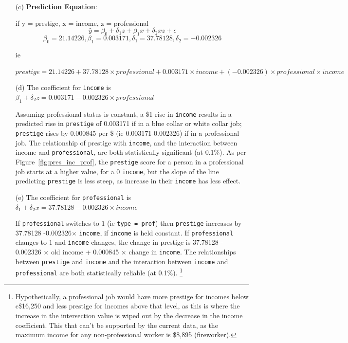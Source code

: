 \documentclass[12pt,letterpaper]{article}
\begin{document}
\begin{enumerate}
\clearpage

	\item [(c)] \textbf{Prediction Equation}:

    if y = prestige, x = income, z = professional
\begin{equation}\label{eq:pred}
    \hat{y}  =  \beta_0 + \delta_1 z + \beta_1x +\delta_2 xz + \epsilon
\end{equation}
\[ \beta_0 = 21.14226, \beta_1 = 0.003171, \delta_1 = 37.78128, \delta_2 = -0.002326\]

  ie
  
    $prestige =
      21.14226 + 37.78128\times professional + 0.003171\times income +
      (-0.002326)\times professional\times income$

	\item [(d)] 	%
	The coefficient for \texttt{income} is $\beta_1 +\delta_2 z = 0.003171 -0.002326\times professional$ 
	
	Assuming professional status is constant, a \$1 rise in \texttt{income} results in a predicted rise in \texttt{prestige} of 0.003171 if in a blue collar or white collar job; \texttt{prestige} rises by 0.000845 per \$ (ie 0.003171-0.002326) if in a professional job.    The relationship of prestige with \texttt{income}, and the interaction between income and \texttt{professional}, are both statistically significant (at 0.1\%).  As per Figure~\ref{fig:pres_inc_prof}, the \texttt{prestige} score for a person in a professional job starts at a higher value, for a 0 \texttt{income}, but the slope of the line predicting \texttt{prestige} is less steep, as increase in their \texttt{income} has less effect.
	
	\item [(e)] %
	The coefficient for \texttt{professional} is $\delta_1  + \delta_2 x =  37.78128-0.002326\times income$
	
  If \texttt{professional} switches to $1$ (ie \texttt{type = prof}) then \texttt{prestige} increases by 37.78128 -0.002326$\times$ \texttt{income}, if \texttt{income} is held constant.
  If \texttt{professional} changes to $1$ and \texttt{income} changes, the change in prestige is 37.78128 - 0.002326 $\times$ old income + 0.000845 $\times$ change in \texttt{income}.    The relationships between \texttt{prestige} and \texttt{income} and the interaction between \texttt{income} and \texttt{professional} are both statistically reliable (at 0.1\%).  \footnote{Hypothetically, a professional job would have more prestige for incomes below c\$16,250 and less prestige for incomes above that level, as this is where the increase in the intersection value is wiped out by the decrease in the income coefficient.  This that can't be supported by the current data, as the maximum income for any non-professional worker is \$8,895 (fireworker).}
	


\end{enumerate}
\end{document}
